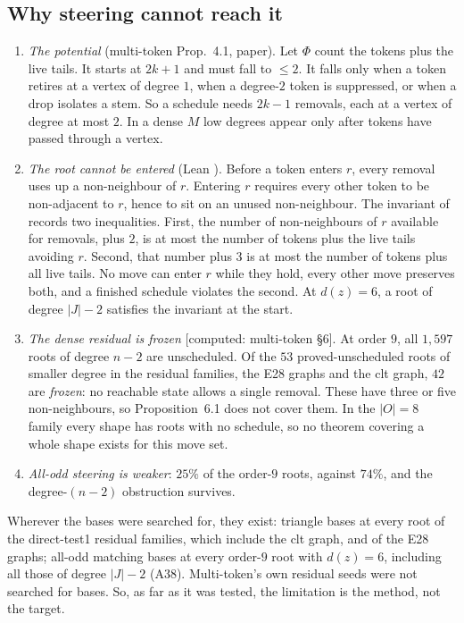 \documentclass[11pt]{amsart}
\theoremstyle{definition}
\newcommand{\st}[1]{\textsf{\small[#1]}}
\begin{document}
\subsection{Why steering cannot reach it}
\begin{enumerate}[leftmargin=*]
\item \emph{The potential} (multi-token Prop.~4.1, paper). Let $\Phi$ count the tokens plus the live
tails. It starts at $2k+1$ and must fall to $\le2$. It falls only when a token retires at a vertex of
degree $1$, when a degree-$2$ token is suppressed, or when a drop isolates a stem. So a schedule needs
$2k-1$ removals, each at a vertex of degree at most $2$. In a dense $M$ low degrees appear only after
tokens have passed through a vertex.
\item \emph{The root cannot be entered} (Lean ). Before a token enters $r$, every
removal uses up a non-neighbour of $r$. Entering $r$ requires every other token to be non-adjacent to
$r$, hence to sit on an unused non-neighbour. The invariant of  records two
inequalities. First, the number of non-neighbours of $r$ available for removals, plus $2$, is at most
the number of tokens plus the live tails avoiding $r$. Second, that number plus $3$ is at most the
number of tokens plus all live tails. No move can enter $r$ while they hold, every other move
preserves both, and a finished schedule violates the second. At $d(z)=6$, a root of degree $|J|-2$ satisfies the invariant at the start.
\item \emph{The dense residual is frozen} \st{computed: multi-token \S6}. At order $9$, all $1{,}597$
roots of degree $n-2$ are unscheduled. Of the $53$ proved-unscheduled roots of smaller degree in the
residual families, the E28 graphs and the clt graph, $42$ are \emph{frozen}: no reachable state allows
a single removal. These have three or five non-neighbours, so Proposition~6.1 does not cover them. In
the $|O|=8$ family every shape has roots with no schedule, so no theorem covering a whole shape exists
for this move set.
\item \emph{All-odd steering is weaker}: $25\%$ of the order-$9$ roots, against $74\%$, and the
degree-$(n-2)$ obstruction survives.
\end{enumerate}
Wherever the bases were searched for, they exist: triangle bases at every root of the direct-test1
residual families, which include the clt graph, and of the E28 graphs; all-odd matching bases at every
order-$9$ root with $d(z)=6$, including all those of degree $|J|-2$ (A38). Multi-token's own residual
seeds were not searched for bases. So, as far as it was tested, the limitation is the method, not the
target.
\end{document}
